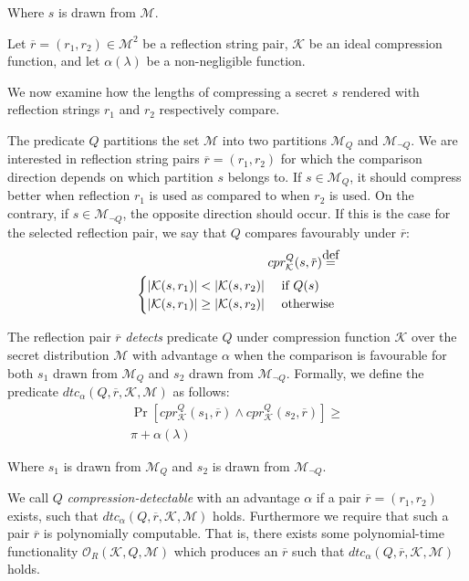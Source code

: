 Where $s$ is drawn from $\mathcal{M}$.

Let $\overbar{r} = (r_1, r_2) \in \mathcal{M}^2$ be a reflection string pair,
$\mathcal{K}$ be an ideal compression function, and let $\alpha(\lambda)$ be a
non-negligible function.

We now examine how the lengths of compressing a secret $s$ rendered with
reflection strings $r_1$ and $r_2$ respectively compare.

The predicate $Q$ partitions the set $\mathcal{M}$ into two partitions
$\mathcal{M}_Q$ and $\mathcal{M}_{\lnot Q}$. We are interested in reflection
string pairs $\overbar{r} = (r_1, r_2)$ for which the comparison direction
depends on which partition $s$ belongs to.  If $s \in \mathcal{M}_Q$, it should
compress better when reflection $r_1$ is used as compared to when $r_2$ is used.
On the contrary, if $s \in \mathcal{M}_{\lnot Q}$, the opposite direction should
occur.  If this is the case for the selected reflection pair, we say that $Q$
compares favourably under $\overbar{r}$:
\begin{equation*}
\begin{split}
    cpr^Q_{\mathcal{K}}(s, \overbar{r})
    \defeq\\
    \begin{cases}
        |\mathcal{K}(s, r_1)| < |\mathcal{K}(s, r_2)| &\text{ if } Q(s)\\
        |\mathcal{K}(s, r_1)| \geq |\mathcal{K}(s, r_2)| &\text{ otherwise}
    \end{cases}
\end{split}
\end{equation*}

The reflection pair $\overbar{r}$ \textit{detects} predicate $Q$ under
compression function $\mathcal{K}$ over the secret distribution $\mathcal{M}$ with
advantage $\alpha$ when the comparison is favourable for both $s_1$ drawn from
$\mathcal{M}_Q$ and $s_2$ drawn from $\mathcal{M}_{\lnot Q}$. Formally, we
define the predicate $dtc_\alpha(Q, \overbar{r}, \mathcal{K}, \mathcal{M})$
as follows:
\begin{align*}
    \Pr
        [cpr^Q_{\mathcal{K}}(s_1, \overbar{r}) \land
         cpr^Q_{\mathcal{K}}(s_2, \overbar{r})]
    \geq\\
    \pi + \alpha(\lambda)
\end{align*}

Where $s_1$ is drawn from $\mathcal{M}_Q$ and $s_2$ is drawn from
$\mathcal{M}_{\lnot Q}$.

We call $Q$ \textit{compression-detectable} with an advantage $\alpha$ if a pair
$\overbar{r} = (r_1, r_2)$ exists, such that $dtc_\alpha(Q, \overbar{r}, \mathcal{K},
\mathcal{M})$ holds. Furthermore we require that such a pair $\overbar{r}$ is
polynomially computable. That is, there exists some polynomial-time
functionality $\mathcal{O}_R(\mathcal{K}, Q, \mathcal{M})$ which produces an
$\overbar{r}$ such that $dtc_\alpha(Q, \overbar{r}, \mathcal{K}, \mathcal{M})$ holds.

